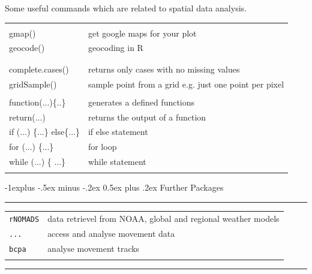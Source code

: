 \documentclass[10pt,landscape]{article}
\makeatletter
\renewcommand{\subsection}{\@startsection{subsection}{2}{0mm}%
                                {-1explus -.5ex minus -.2ex}%
                                {0.5ex plus .2ex}%
                                {\normalfont\normalsize\bfseries}}
\makeatother
\begin{document}
\begin{multicols}{3}
Some useful commands which are related to spatial data analysis.


\begin{tabular}{@{}p{\the\MyLen}%
                @{}p{\linewidth-\the\MyLen}@{}}
                & \\
gmap() & get google maps for your plot \\
geocode() & geocoding in R \\
 &  \\
 &  \\

complete.cases() &  returns only cases with no missing values \\                
gridSample() & sample point from a grid e.g. just one point per pixel \\

 & \\
function(...)\{..\} & generates a defined functions\\
return(...) & returns the output of a function \\
if (...) \{...\} else\{...\} & if else statement \\
for (...) \{...\} & for loop \\
while (...) \{ ...\} & while statement \\
 & \\


\end{tabular}

\subsection{Further Packages}

\rule{0.32\textwidth}{0.4pt}

\begin{tabular}{@{}ll@{}}
\verb!rNOMADS!    & data retrievel from NOAA, global and regional weather models \\
\verb!...!  & access and analyse movement data\\
\verb!bcpa!  & analyse movement tracks\\
& \\
\end{tabular}




\scriptsize

\rule{0.32\textwidth}{0.4pt}


\end{multicols}
\end{document}

